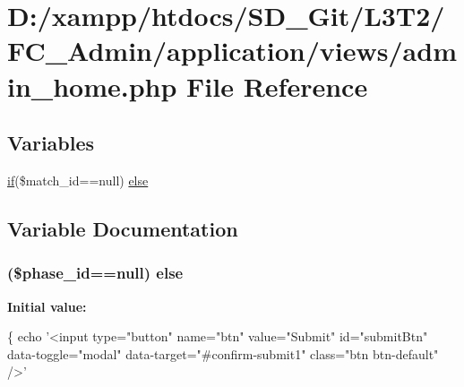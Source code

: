 \hypertarget{admin__home_8php}{}\section{D\+:/xampp/htdocs/\+S\+D\+\_\+\+Git/\+L3\+T2/\+F\+C\+\_\+\+Admin/application/views/admin\+\_\+home.php File Reference}
\label{admin__home_8php}
\subsection*{Variables}
\begin{DoxyCompactItemize}
\item 
\hyperlink{assets_2js_2bootstrap_8min_8js_a87cf461060832b8b68a7b48d9e371e4f}{if}(\$match\+\_\+id==null) \hyperlink{admin__home_8php_af1e98bdf252a78867e822309eb424c6d}{else}
\end{DoxyCompactItemize}


\subsection{Variable Documentation}
\hypertarget{admin__home_8php_af1e98bdf252a78867e822309eb424c6d}{}
\subsubsection[{else}]{ (\$phase\+\_\+id==null) else}\label{admin__home_8php_af1e98bdf252a78867e822309eb424c6d}
{\bfseries Initial value\+:}
\begin{DoxyCode}
\{
            echo \textcolor{stringliteral}{'<input type="button" name="btn" value="Submit" id="submitBtn" data-toggle="modal"
       data-target="#confirm-submit1" class="btn btn-default" />'}
\end{DoxyCode}
